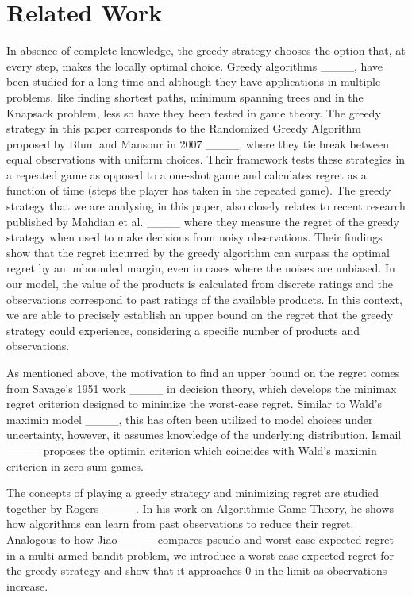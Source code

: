 \section{Related Work}
In absence of complete knowledge, the greedy strategy chooses the option that, at every step, makes the locally optimal choice. 
Greedy algorithms ____, have been studied for a long time and although they have applications in multiple problems, like finding shortest paths, minimum spanning trees and in the Knapsack problem, less so have they been tested in game theory. The greedy strategy in this paper corresponds to the Randomized Greedy Algorithm proposed by Blum and Mansour in 2007 ____, where they tie break between equal observations with uniform choices. Their framework tests these strategies in a repeated game as opposed to a one-shot game and calculates regret as a function of time (steps the player has taken in the repeated game). The greedy strategy that we are analysing in this paper, also closely relates to recent research published by Mahdian et al. ____ where they measure the regret of the greedy strategy when used to make decisions from noisy observations. Their findings show that the regret incurred by the greedy algorithm can surpass the optimal regret by an unbounded margin, even in cases where the noises are unbiased. In our model, the value of the products is calculated from discrete ratings and the observations correspond to past ratings of the available products. In this context, we are able to precisely establish an upper bound on the regret that the greedy strategy could experience, considering a specific number of products and observations.

As mentioned above, the motivation to find an upper bound on the regret comes from Savage's 1951 work ____ in decision theory, which develops the minimax regret criterion designed to minimize the worst-case regret. Similar to Wald's maximin model ____, this has often been utilized to model choices under uncertainty, however, it assumes knowledge of the underlying distribution. Ismail ____ proposes the optimin criterion which coincides with Wald's maximin criterion in zero-sum games.

The concepts of playing a greedy strategy and minimizing regret are studied together by Rogers ____. In his work on Algorithmic Game Theory, he shows how algorithms can learn from past observations to reduce their regret. Analogous to how Jiao ____ compares pseudo and worst-case expected regret in a multi-armed bandit problem, we introduce a worst-case expected regret for the greedy strategy and show that it approaches 0 in the limit as observations increase. 

